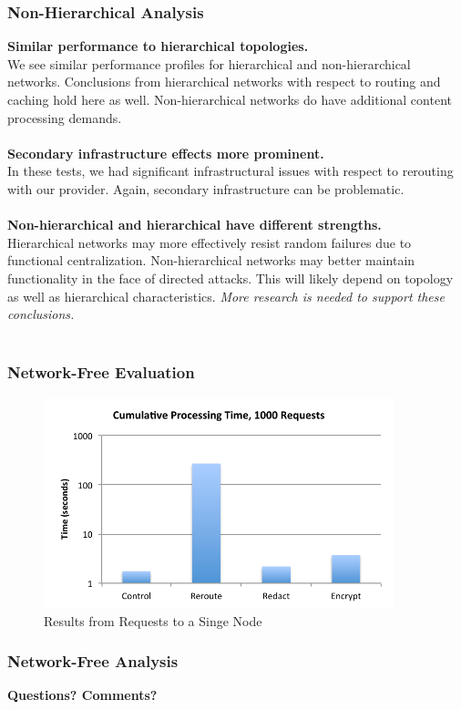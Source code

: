 \documentclass[t,handout]{beamer}
\begin{document}
\begin{frame}
\frametitle{Non-Hierarchical Analysis}
{\bf Similar performance to hierarchical topologies.} \\
{\scriptsize We see similar performance profiles for hierarchical and non-hierarchical networks.  Conclusions from hierarchical networks with respect to routing and caching hold here as well. Non-hierarchical networks do have additional content processing demands.} \\
~\\
{\bf Secondary infrastructure effects more prominent.} \\
{\scriptsize In these tests, we had significant infrastructural issues with respect to rerouting with our provider.  Again, secondary infrastructure can be problematic.  } \\
~\\
{\bf Non-hierarchical and hierarchical have different strengths.} \\
{\scriptsize Hierarchical networks may more effectively resist random failures due to functional centralization. Non-hierarchical networks may better maintain functionality in the face of directed attacks.  This will likely depend on topology as well as hierarchical characteristics.  \textit{More research is needed to support these conclusions.}} \\
~\\
\end{frame}

\begin{frame}
\frametitle{Network-Free Evaluation}
\begin{figure}[!t]
\centering
\includegraphics[width=4in]{single-node-results}
\caption{Results from Requests to a Singe Node}
\end{figure}
\end{frame}

\begin{frame}
\frametitle{Network-Free Analysis}

\end{frame}


%
%
%
%
%

%

\begin{frame}[c]
\begin{center}
\textbf{Questions? Comments?}
\end{center}
\end{frame}

%
\end{document}
